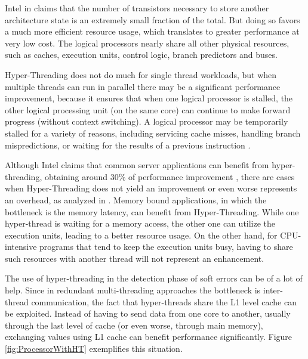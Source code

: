 Intel in \cite{Hyper-Threading} claims that the number of transistors necessary to store another architecture state is an extremely small fraction of the total. But doing so favors a much more efficient resource usage, which translates to greater performance at very low cost. The logical processors nearly share all other physical resources, such as caches, execution units, control logic, branch predictors and buses. 

Hyper-Threading does not do much for single thread workloads, but when multiple threads can run in parallel there may be a significant performance improvement, because it ensures that when one logical processor is stalled, the other logical processing unit (on the same core) can continue to make forward  progress (without context switching). A logical processor may be temporarily stalled for a variety of reasons, including servicing cache misses, handling  branch mispredictions, or waiting for the results of a previous instruction \cite{Hyper-Threading}.

Although Intel claims that common server applications can benefit from hyper-threading, obtaining around 30\% of performance improvement \cite{Hyper-Threading}, there are cases when Hyper-Threading does not yield an improvement or even worse represents an overhead, as analyzed in \cite{saini2011impact}. Memory bound applications, in which the bottleneck is the memory latency, can benefit from Hyper-Threading. While one hyper-thread is waiting for a memory access, the other one can utilize the execution units, leading to a better resource usage. On the other hand, for CPU-intensive programs that tend to keep the execution units busy, having to share such resources with another thread will not represent an enhancement. 

The use of hyper-threading in the detection phase of soft errors can be of a lot of help. Since in redundant multi-threading approaches the bottleneck is inter-thread communication, the fact that hyper-threads share the L1 level cache can be exploited. Instead of having to send data from one core to another, usually through the last level of cache (or even worse, through main memory), exchanging values using L1 cache can benefit performance significantly. Figure \ref{fig:ProcessorWithHT} exemplifies this situation.  

